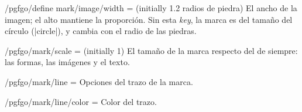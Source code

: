 \begin{key}{/pgfgo/define mark/image/width =  (initially 1.2 radios de piedra)}
	El ancho de la imagen; el alto mantiene la proporción. Sin esta \emph{key}, la marca es del tamaño del círculo (|circle|), y cambia con el radio de las piedras.

	\begin{codeexample}[]

		\begin{goban}[5, partial = B2:D4]
		\end{goban}
	\end{codeexample}
\end{key}


\begin{key}{/pgfgo/mark/scale =  (initially 1)}
	El tamaño de la marca respecto del de siempre: las formas, las imágenes y el texto.

	\begin{codeexample}[]
		\begin{goban}[5, partial = B2:D4]
		\end{goban}
	\end{codeexample}
\end{key}


\begin{key}{/pgfgo/mark/line = }
	Opciones del trazo de la marca.
\end{key}


\begin{key}{/pgfgo/mark/line/color = }
	Color del trazo.
	
	\begin{codeexample}[]
		
		\begin{goban}
		\end{goban}
		
		\begin{goban}
			\stones[b]{C2,D3}
			\stone[w]{B4}
			\mark[triangle, line = {color = red}]{C3}
		\end{goban}
	\end{codeexample}
\end{key}


